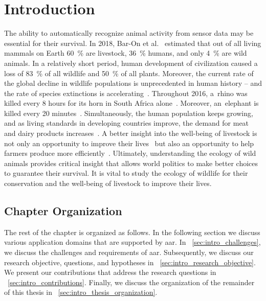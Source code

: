 \section{Introduction}
\label{sec:intro_introduction}

The ability to automatically recognize animal activity from sensor data may be essential for their survival.
In 2018, Bar-On et al.~\cite{BarOn2018} estimated that out of all living mammals on Earth \SI{60}{\%} are livestock, \SI{36}{\%} humans, and only  \SI{4}{\%} are wild animals.
In a relatively short period, human development of civilization caused a loss of \SI{83}{\%} of all wildlife and \SI{50}{\%} of all plants.
Moreover, the current rate of the global decline in wildlife populations is unprecedented in human history -- and the rate of species extinctions is accelerating~\cite{Diaz2019}. 
Throughout 2016, a~rhino was killed every 8 hours for its horn in South Africa alone~\cite{PoachingStat}.
Moreover, an~elephant is killed every 20 minutes~\cite{Wittemyer2014}.
Simultaneously, the human population keeps growing, and as living standards in developing countries improve, the demand for meat and dairy products increases~\cite{Gandhi2010}.
A better insight into the well-being of livestock is not only an opportunity to improve their lives~\cite{Mench1998} but also an opportunity to help farmers produce more efficiently~\cite{Lokhorst2018}.
Ultimately, understanding the ecology of wild animals provides critical insight that allows world politics to make better choices to guarantee their survival.
It is vital to study the ecology of wildlife for their conservation and the well-being of livestock to improve their lives.




\subsection{Chapter Organization}

The rest of the chapter is organized as follows.
In the following section we discuss various application domains that are supported by \gls{aar}.
In \sectionname~\ref{sec:intro_challenges}, we discuss the challenges and requirements of \gls{aar}.
Subsequently, we discuss our research objective, questions, and hypotheses in \sectionname~\ref{sec:intro_research_objective}.
We present our contributions that address the research questions in \sectionname~\ref{sec:intro_contributions}.
Finally, we discuss the organization of the remainder of this thesis in \sectionname~\ref{sec:intro_thesis_organization}.